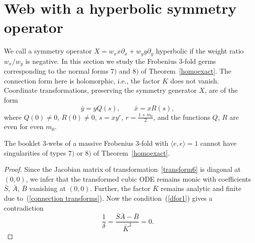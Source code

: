 \documentclass[pdftex]{sigma}
\begin{document}
\section{Web with a hyperbolic symmetry operator}
We call a symmetry operator $X=w_xx\partial_x+w_yy\partial_y$ hyperbolic if the weight ratio $w_x/w_y$ is negative. In this section we study the Frobenius $3$-fold germs corresponding to the normal forms $7)$ and $8)$ of Theorem~\ref{homoexact}.
The connection form here is holomorphic, i.e., the factor $K$ does not vanish.
Coordinate transformations, preserving the symmetry generator $X$, are of the form
\begin{equation}\label{transform6}
\bar{y}=yQ(s), \qquad \bar{x}=xR(s),
\end{equation}
 where $Q(0)\ne 0$, $R(0)\ne 0$, $s=xy^r$, $r=\frac{1+m_0}{2}$, and the functions $Q$, $R$ are even for even $m_0$.

\begin{proposition}
The booklet $3$-webs of a massive Frobenius $3$-fold with $\langle e,e\rangle =1$
cannot have singularities of types $7)$ or $8)$ of Theorem~{\rm\ref{homoexact}}.
\end{proposition}
\begin{proof} Since the Jacobian matrix of transformation~\eqref{transform6} is diagonal at $(0,0)$,
we infer that the transformed cubic ODE remains monic %
with coef\/f\/icients $\bar{S}$, $\bar{A}$, $\bar{B}$ vanishing at $(0,0)$.
Further, the factor $\bar{K}$ remains analytic and f\/inite due to~(\ref{connection transforms}).
Now the condition~(\ref{dfor1})
gives a contradiction
\[
\frac{1}{\delta}=\frac{\bar{S}\bar{A}-\bar{B}}{\bar{K}^2}=0.\tag*{\qed}
\]
\renewcommand{\qed}{}
\end{proof}
\end{document}
